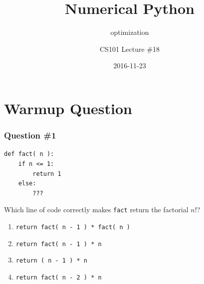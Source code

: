 \documentclass[11pt]{beamer}
\title{Numerical Python}
\subtitle{optimization}
\author{CS101 Lecture \#18}
\date{2016-11-23}
\begin{document}
  \setcounter{showProgressBar}{0}
  \setcounter{showSlideNumbers}{0}

\frame{\titlepage}

\setcounter{framenumber}{0}
\setcounter{showProgressBar}{1}
\setcounter{showSlideNumbers}{1}

\iffalse
\section{Warmup Question}

\begin{frame}[fragile]
  \frametitle{Question \#1}

  \begin{Verbatim}
def fact( n ):
    if n <= 1:
        return 1
    else:
        ???
  \end{Verbatim}

Which line of code correctly makes \texttt{fact} return the factorial $n!$?

  \begin{enumerate}[label=\Alph*]
    \item  \texttt{return fact( n - 1 ) * fact( n )}
    \item  \texttt{return fact( n - 1 ) * n}
    \item  \texttt{return ( n - 1 ) * n}
    \item  \texttt{return fact( n - 2 ) * n}
  \end{enumerate}
\end{frame}
\end{document}
